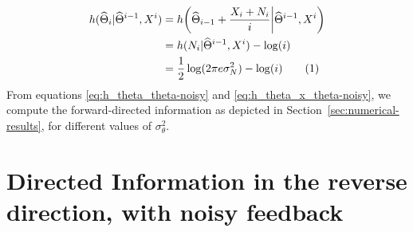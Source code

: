 \documentclass[conference]{IEEEtran}
\newcommand\numberthis{\stepcounter{equation}\tag{\theequation}}
\begin{document}
\begin{align*}
	h(\widehat\Theta_i | \widehat\Theta^{i-1}, X^i) &= h \bigg( \widehat\Theta_{i-1} + \frac{X_i + N_i}{i} \bigg| \widehat\Theta^{i-1}, X^i \bigg) \\
													&= h(N_i | \widehat\Theta^{i-1}, X^i) -\log(i) \\
													&= \frac{1}{2}\log(2 \pi e \sigma_N^2) -\log(i) \numberthis \label{eq:h_theta_x_theta-noisy}
\end{align*}
From equations \eqref{eq:h_theta_theta-noisy} and \eqref{eq:h_theta_x_theta-noisy}, we compute the forward-directed information as depicted in Section~\ref{sec:numerical-results}, for different values of $\sigma_\theta^2$.

\section{Directed Information in the reverse direction, with noisy feedback}
\label{app:appendix2}
\end{document}
